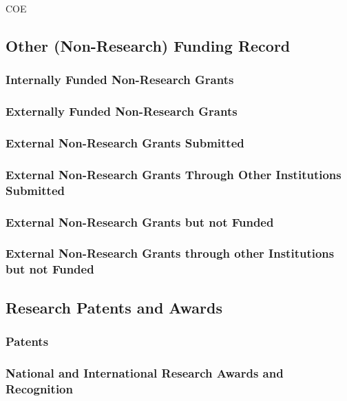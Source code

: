 \begin{taggedblock}{COE}
  \subsection{Other (Non-Research) Funding Record}
  \subsubsection{Internally Funded Non-Research Grants}
  \subsubsection{Externally Funded Non-Research Grants}
  \subsubsection{External Non-Research Grants Submitted}
  \subsubsection{External Non-Research Grants Through Other Institutions
    Submitted}
  \subsubsection{External Non-Research Grants but not Funded}
  \subsubsection{External Non-Research Grants through other Institutions but not Funded}

\end{taggedblock}

\subsection{Research Patents and Awards}
\subsubsection{Patents}
\subsubsection{National and International Research Awards and Recognition}

